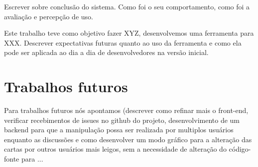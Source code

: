 \label{consideracoes}

Escrever sobre conclusão do sistema. Como foi o seu comportamento, como foi a avaliação e percepção de uso.

Este trabalho teve como objetivo fazer XYZ, desenvolvemos uma ferramenta para XXX. Descrever expectativas futuras quanto ao uso da ferramenta e como ela pode ser aplicada ao dia a dia de desenvolvedores na versão inicial.

\section{Trabalhos futuros}
Para trabalhos futuros nós apontamos (descrever como refinar mais o front-end, verificar recebimentos de issues no github do projeto, desenvolvimento de um backend para que a manipulação possa ser realizada por multiplos usuários enquanto as discussões e como desenvolver um modo gráfico para a alteração das cartas por outros usuários mais leigos, sem a necessidade de alteração do código-fonte para ...